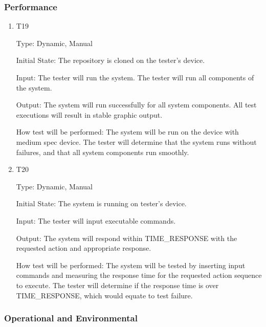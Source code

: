 \documentclass[12pt, titlepage]{article}
\begin{document}
\subsubsection{Performance}

\begin{enumerate}

\item{T19}

Type: Dynamic, Manual

Initial State: The repository is cloned on the tester's device.

Input: The tester will run the system. The tester will run all components of the system.

Output: The system will run successfully for all system components. All test executions will result in stable graphic output.

How test will be performed: The system will be run on the device with medium spec device. The tester will determine that the system runs without failures, and that all system components run smoothly.

\item{T20}

Type: Dynamic, Manual

Initial State: The system is running on tester's device.

Input: The tester will input executable commands.

Output: The system will respond within TIME\_RESPONSE with the requested action and appropriate response.

How test will be performed: The system will be tested by inserting input commands and measuring the response time for the requested action sequence to execute. The tester will determine if the response time is over TIME\_RESPONSE, which would equate to test failure.

\end{enumerate}

\subsubsection{Operational and Environmental}
\end{document}
